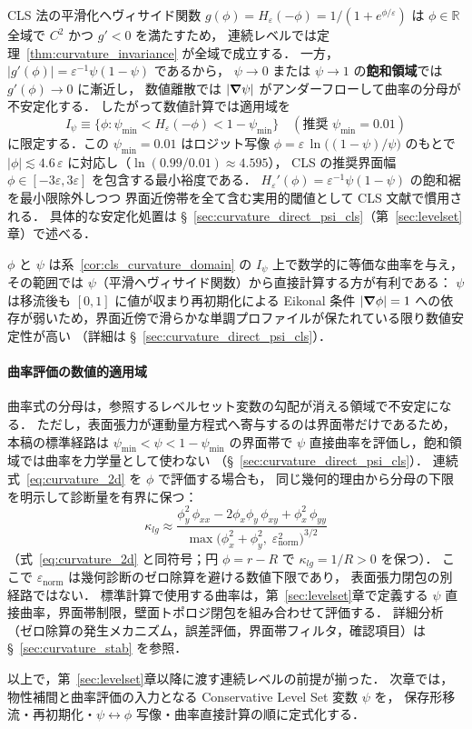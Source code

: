 \begin{corollary}
\label{cor:cls_curvature_domain}
CLS 法の平滑化ヘヴィサイド関数
$g(\phi) = H_\varepsilon(-\phi)=1/(1+e^{\phi/\varepsilon})$ は
$\phi \in \mathbb{R}$ 全域で $C^2$ かつ $g' < 0$ を満たすため，
連続レベルでは定理~\ref{thm:curvature_invariance} が全域で成立する．
一方，$|g'(\phi)| = \varepsilon^{-1}\psi(1-\psi)$ であるから，
$\psi \to 0$ または $\psi \to 1$ の\textbf{飽和領域}では $g'(\phi) \to 0$ に漸近し，
数値離散では $|\bm{\nabla}\psi|$ がアンダーフローして曲率の分母が不安定化する．
したがって数値計算では適用域を
\[
  I_\psi \equiv \{\phi : \psi_{\min} < H_\varepsilon(-\phi) < 1 - \psi_{\min}\}
  \quad (\text{推奨 } \psi_{\min} = 0.01)
\]
に限定する．この $\psi_{\min}=0.01$ はロジット写像
$\phi = \varepsilon\,\ln\bigl((1-\psi)/\psi\bigr)$ のもとで
$|\phi| \lesssim 4.6\,\varepsilon$ に対応し（$\ln(0.99/0.01)\approx 4.595$），
CLS の推奨界面幅 $\phi\in[-3\varepsilon,3\varepsilon]$ を包含する最小裕度である．
$H_\varepsilon'(\phi) = \varepsilon^{-1}\psi(1-\psi)$ の飽和裾を最小限除外しつつ
界面近傍帯を全て含む実用的閾値として CLS 文献で慣用される．
具体的な安定化処置は §~\ref{sec:curvature_direct_psi_cls}（第~\ref{sec:levelset}章）で述べる．
\end{corollary}

\noindent
$\phi$ と $\psi$ は系~\ref{cor:cls_curvature_domain} の
$I_\psi$ 上で数学的に等価な曲率を与え，
その範囲では $\psi$（平滑ヘヴィサイド関数）から直接計算する方が有利である：
$\psi$ は移流後も $[0,1]$ に値が収まり再初期化による Eikonal 条件 $|\bm{\nabla}\phi|=1$
への依存が弱いため，界面近傍で滑らかな単調プロファイルが保たれている限り数値安定性が高い
（詳細は §~\ref{sec:curvature_direct_psi_cls}）．

\paragraph{曲率評価の数値的適用域}
曲率式の分母は，参照するレベルセット変数の勾配が消える領域で不安定になる．
ただし，表面張力が運動量方程式へ寄与するのは界面帯だけであるため，
本稿の標準経路は $\psi_{\min}<\psi<1-\psi_{\min}$ の界面帯で
$\psi$ 直接曲率を評価し，飽和領域では曲率を力学量として使わない
（§~\ref{sec:curvature_direct_psi_cls}）．
連続式~\eqref{eq:curvature_2d} を $\phi$ で評価する場合も，
同じ幾何的理由から分母の下限を明示して診断量を有界に保つ：
\begin{equation}
  \kappa_{lg} \approx \frac{
    \phi_y^2\,\phi_{xx} - 2\phi_x\phi_y\,\phi_{xy} + \phi_x^2\,\phi_{yy}
  }{\max\!\bigl(\phi_x^2 + \phi_y^2,\; \varepsilon_{\text{norm}}^2\bigr)^{3/2}}
  \label{eq:curvature_clamped}
\end{equation}
（式~\eqref{eq:curvature_2d} と同符号；円 $\phi=r-R$ で $\kappa_{lg}=1/R>0$ を保つ）．
ここで $\varepsilon_{\text{norm}}$ は幾何診断のゼロ除算を避ける数値下限であり，
表面張力閉包の別経路ではない．
標準計算で使用する曲率は，第~\ref{sec:levelset}章で定義する
$\psi$ 直接曲率，界面帯制限，壁面トポロジ閉包を組み合わせて評価する．
詳細分析（ゼロ除算の発生メカニズム，誤差評価，界面帯フィルタ，確認項目）は
§~\ref{sec:curvature_stab} を参照．

\medskip
以上で，第~\ref{sec:levelset}章以降に渡す連続レベルの前提が揃った．
次章では，物性補間と曲率評価の入力となる Conservative Level Set 変数 $\psi$ を，
保存形移流・再初期化・$\psi\leftrightarrow\phi$ 写像・曲率直接計算の順に定式化する．
